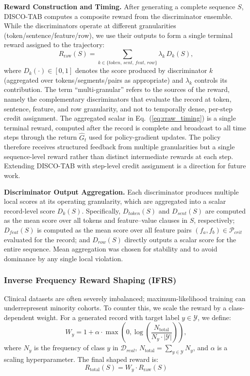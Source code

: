\noindent\textbf{Reward Construction and Timing.}
After generating a complete sequence $S$, DISCO-TAB computes a composite reward from the discriminator ensemble. While the discriminators operate at different granularities (token/sentence/feature/row), we use their outputs to form a single terminal reward assigned to the trajectory:
\begin{equation}
\label{eq:rraw_timing}
R_{\text{raw}}(S) = \sum_{k \in \{token,\,sent,\,feat,\,row\}} \lambda_k\, D_k(S),
\end{equation}
where $D_k(\cdot)\in[0,1]$ denotes the score produced by discriminator $k$ (aggregated over tokens/segments/pairs as appropriate) and $\lambda_k$ controls its contribution. The term ``multi-granular'' refers to the sources of the reward, namely the complementary discriminators that evaluate the record at token, sentence, feature, and row granularity, and not to temporally dense, per-step credit assignment. The aggregated scalar in Eq.~(\ref{eq:rraw_timing}) is a single terminal reward, computed after the record is complete and broadcast to all time steps through the return $\hat{G}_t$ used for policy-gradient updates. The policy therefore receives structured feedback from multiple granularities but a single sequence-level reward rather than distinct intermediate rewards at each step. Extending DISCO-TAB with step-level credit assignment is a direction for future work.

\noindent\textbf{Discriminator Output Aggregation.}
Each discriminator produces multiple local scores at its operating granularity, which are aggregated into a scalar record-level score $D_k(S)$. Specifically, $D_{token}(S)$ and $D_{sent}(S)$ are computed as the mean score over all tokens and feature--value clauses in $S$, respectively; $D_{feat}(S)$ is computed as the mean score over all feature pairs $(f_a,f_b)\in\mathcal{P}_{crit}$ evaluated for the record; and $D_{row}(S)$ directly outputs a scalar score for the entire sequence. Mean aggregation was chosen for stability and to avoid dominance by any single local violation.


\subsubsection{Inverse Frequency Reward Shaping (IFRS)}
Clinical datasets are often severely imbalanced; maximum-likelihood training can underrepresent minority cohorts. To counter this, we scale the reward by a class-dependent weight. For a generated record with target label $y \in \mathcal{Y}$, we define:
\begin{equation}
W_y = 1 + \alpha \cdot \max\left(0, \log\left(\frac{N_{\text{total}}}{N_y \cdot |\mathcal{Y}|}\right)\right),
\end{equation}
where $N_y$ is the frequency of class $y$ in $\mathcal{D}_{real}$, $N_{\text{total}}=\sum_{y\in\mathcal{Y}}N_y$, and $\alpha$ is a scaling hyperparameter. The final shaped reward is:
\begin{equation}
R_{\text{total}}(S) = W_y \cdot R_{\text{raw}}(S)
\end{equation}

